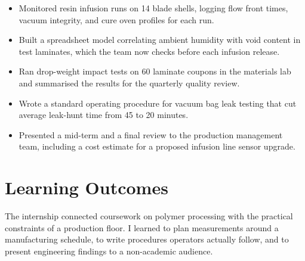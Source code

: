 \documentclass[11pt]{article}
\begin{document}
\begin{itemize}[leftmargin=1.4em, itemsep=0.25em]
  \item Monitored resin infusion runs on 14 blade shells, logging flow front
        times, vacuum integrity, and cure oven profiles for each run.
  \item Built a spreadsheet model correlating ambient humidity with void
        content in test laminates, which the team now checks before each
        infusion release.
  \item Ran drop-weight impact tests on 60 laminate coupons in the materials
        lab and summarised the results for the quarterly quality review.
  \item Wrote a standard operating procedure for vacuum bag leak testing that
        cut average leak-hunt time from 45 to 20 minutes.
  \item Presented a mid-term and a final review to the production management
        team, including a cost estimate for a proposed infusion line sensor
        upgrade.
\end{itemize}

\section*{Learning Outcomes}
The internship connected coursework on polymer processing with the practical
constraints of a production floor. I learned to plan measurements around a
manufacturing schedule, to write procedures operators actually follow, and to
present engineering findings to a non-academic audience.
\end{document}
